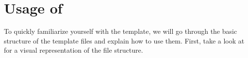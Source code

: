 \chapter{Usage of \TeXsis{}} \label{ch:Usage}

To quickly familiarize yourself with the \TeXsis{} template, we will go through the basic structure of the template files and explain how to use them.
First, take a look at  for a visual representation of the file structure.
%
%
%
%

